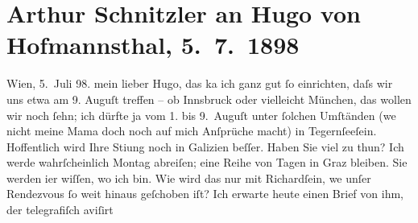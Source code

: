 

         
         \newcommand{\erwaehntePersonen}{Personen: Richard Beer-Hofmann, Hugo von Hofmannsthal, Louise Schnitzler}
         \newcommand{\erwaehnteOrte}{Orte: Galizien, Graz, Innsbruck, München, Tegernsee, Tschortkiw, Wien}
         \newcommand{\erwaehnteWerke}{Werke: Der Schleier der Beatrice. Schauspiel in fünf Akten}
               \section[Arthur Schnitzler an Hugo von Hofmannsthal, 5. 7. 1898]{ Arthur Schnitzler an Hugo von Hofmannsthal, 5. 7. 1898}\nopagebreak{}\rehead{ }\begin{ledgroupsized}[t]{13cm}\normalsize\beginnumbering \toendnotes[C]{\smallbreak\pagebreak[2]} 
\toendnotes[C]{\smallbreak}\pstart
           \raggedleft{}{\pb}Wien, 5. Juli 98.\pend
           \pstart
           mein lieber Hugo, das ka{\geminationn} ich ganz
                    gut ſo einrichten, daſs wir uns etwa am 9. Auguſt treffen – ob Innsbruck oder vielleicht München, das wollen wir noch ſehn; ich dürfte ja vom
                        1. bis 9. Auguſt unter ſolchen Umſtänden (we{\geminationn} nicht meine Mama doch noch auf mich Anſprüche macht) in Tegernſeeſein. Hoffentlich wird Ihre Sti{\geminationm}ung {\pb}noch in Galizien beſſer. Haben Sie viel zu thun?\pend
           \pstart
           Ich werde wahrſcheinlich Montag abreiſen; eine Reihe von Tagen in
                        Graz bleiben. Sie werden i{\geminationm}er wiſſen, wo ich bin. Wie wird das nur mit Richardſein, we{\geminationn} unſer Rendezvous ſo weit hinaus
                    geſchoben iſt? Ich erwarte heute einen Brief von ihm, der telegrafiſch aviſirt

\end{ledgroupsized}
